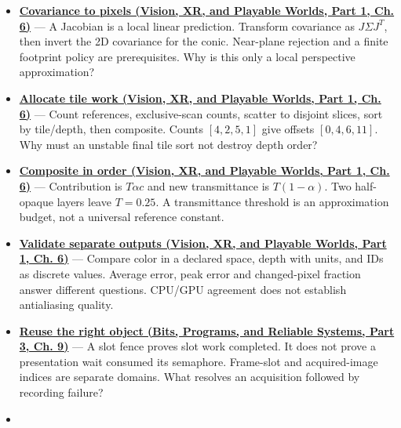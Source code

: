 \begin{itemize}
\item
  \textbf{\href{../07-Vision-XR-and-Playable-Worlds-P01/main.pdf\#nameddest=04-visual-computing-ii-ch037-local-projection-turns-an-ellipsoid-into-a-screen-ellipse}{Covariance to pixels (Vision, XR, and Playable Worlds, Part 1, Ch. 6)}} --- A Jacobian is a local linear prediction. Transform covariance as \(J\Sigma J^T\), then invert the 2D covariance for the conic. Near-plane rejection and a finite footprint policy are prerequisites. Why is this only a local perspective approximation?
\item
  \textbf{\href{../07-Vision-XR-and-Playable-Worlds-P01/main.pdf\#nameddest=04-visual-computing-ii-ch037-from-ellipses-to-bounded-tile-work}{Allocate tile work (Vision, XR, and Playable Worlds, Part 1, Ch. 6)}} --- Count references, exclusive-scan counts, scatter to disjoint slices, sort by tile/depth, then composite. Counts \([4,2,5,1]\) give offsets \([0,4,6,11]\). Why must an unstable final tile sort not destroy depth order?
\item
  \textbf{\href{../07-Vision-XR-and-Playable-Worlds-P01/main.pdf\#nameddest=04-visual-computing-ii-ch037-figure-er1---footprint-compositing-order-and-storage-lifetime}{Composite in order (Vision, XR, and Playable Worlds, Part 1, Ch. 6)}} --- Contribution is \(T\alpha c\) and new transmittance is \(T(1-\alpha)\). Two half-opaque layers leave \(T=0.25\). A transmittance threshold is an approximation budget, not a universal reference constant.
\item
  \textbf{\href{../07-Vision-XR-and-Playable-Worlds-P01/main.pdf\#nameddest=04-visual-computing-ii-ch037-validation-should-isolate-representations-before-images}{Validate separate outputs (Vision, XR, and Playable Worlds, Part 1, Ch. 6)}} --- Compare color in a declared space, depth with units, and IDs as discrete values. Average error, peak error and changed-pixel fraction answer different questions. CPU/GPU agreement does not establish antialiasing quality.
\item
  \textbf{\href{../01-Bits-Programs-and-Reliable-Systems-P03/main.pdf\#nameddest=01-foundations-i-ch011-follow-a-frame-slot-and-a-presentation-image-separately}{Reuse the right object (Bits, Programs, and Reliable Systems, Part 3, Ch. 9)}} --- A slot fence proves slot work completed. It does not prove a presentation wait consumed its semaphore. Frame-slot and acquired-image indices are separate domains. What resolves an acquisition followed by recording failure?
\item

\end{itemize}
